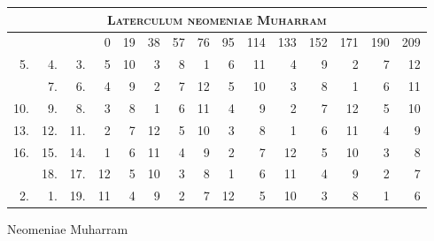 %
\begin{tabnums} %
\normalsize
\centering
\renewcommand{\arraystretch}{1.040} %
\newcommand{\hts}{\normalsize}
%
\newcommand{\da}{\scriptsize{†}}
\begin{tabular}{@{} r r r *{12}{r} @{}}
\toprule
\multicolumn{15}{c}{\Large\textsc{Laterculum neomeniae Muharram}} \\
\toprule
  ~ & ~ & ~ &
  \hts{0} & \hts{19} & \hts{38} & \hts{57} & \hts{76} & \hts{95} &
  \hts{114} & \hts{133} & \hts{152} & \hts{171} & \hts{190} & \hts{209}
\\
\cmidrule(l){4-15}
 5. &  4. &  3. &  5 & 10 &  3 & 8 &  1 &  6 & 11 &  4 & 9 &  2 & 7 & 12 \\
    &  7. &  6. &  4 &  9 &  2 & 7 & 12 &  5 & 10 &  3 & 8 &  1 & 6 & 11 \\
10. &  9. &  8. &  3 &  8 &  1 & 6 & 11 &  4 &  9 &  2 & 7 & 12 & 5 & 10 \\
13. & 12. & 11. &  2 &  7 & 12 & 5 & 10 &  3 &  8 &  1 & 6 & 11 & 4 &  9 \\
16. & 15. & 14. &  1 &  6 & 11 & 4 &  9 &  2 &  7 & 12 & 5 & 10 & 3 &  8 \\
    & 18. & 17. & 12 &  5 & 10 & 3 &  8 &  1 &  6 & 11 & 4 &  9 & 2 &  7 \\
 2. &  1. & 19. & 11 &  4 &  9 & 2 &  7 & 12 &  5 & 10 & 3 &  8 & 1 &  6 \\
\bottomrule
\end{tabular}
%
\caption{Neomeniae Muharram}
\label{tab:p140}
%
\end{tabnums}
